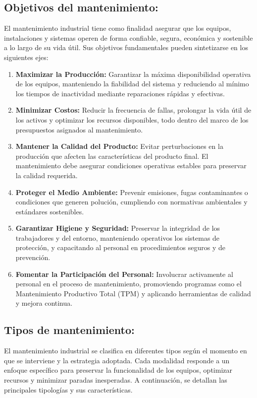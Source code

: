 \documentclass[a4paper,oneside,11pt]{article}
\begin{document}
\subsection{Objetivos del mantenimiento:}

El mantenimiento industrial tiene como finalidad asegurar que los equipos, instalaciones y sistemas operen de forma confiable, segura, económica y sostenible a lo largo de su vida útil. Sus objetivos fundamentales pueden sintetizarse en los siguientes ejes:

\begin{enumerate}
    \item \textbf{Maximizar la Producción:} Garantizar la máxima disponibilidad operativa de los equipos, manteniendo la fiabilidad del sistema y reduciendo al mínimo los tiempos de inactividad mediante reparaciones rápidas y efectivas.
    \item \textbf{Minimizar Costos:} Reducir la frecuencia de fallas, prolongar la vida útil de los activos y optimizar los recursos disponibles, todo dentro del marco de los presupuestos asignados al mantenimiento.
    \item \textbf{Mantener la Calidad del Producto:} Evitar perturbaciones en la producción que afecten las características del producto final. El mantenimiento debe asegurar condiciones operativas estables para preservar la calidad requerida.
    \item \textbf{Proteger el Medio Ambiente:} Prevenir emisiones, fugas contaminantes o condiciones que generen polución, cumpliendo con normativas ambientales y estándares sostenibles.
    \item \textbf{Garantizar Higiene y Seguridad:} Preservar la integridad de los trabajadores y del entorno, manteniendo operativos los sistemas de protección, y capacitando al personal en procedimientos seguros y de prevención.
    \item \textbf{Fomentar la Participación del Personal:} Involucrar activamente al personal en el proceso de mantenimiento, promoviendo programas como el Mantenimiento Productivo Total (TPM) y aplicando herramientas de calidad y mejora continua.
\end{enumerate}

\subsection{Tipos de mantenimiento:}

El mantenimiento industrial se clasifica en diferentes tipos según el momento en que se interviene y la estrategia adoptada. Cada modalidad responde a un enfoque específico para preservar la funcionalidad de los equipos, optimizar recursos y minimizar paradas inesperadas. A continuación, se detallan las principales tipologías y sus características.
\end{document}

